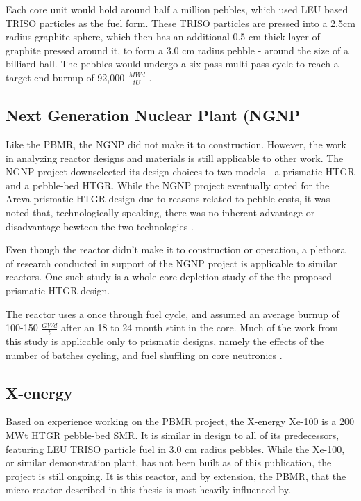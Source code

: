 

Each core unit would hold around half a million pebbles, which used LEU based TRISO particles as the fuel form.  These TRISO particles are pressed into a 2.5cm radius graphite sphere, which then has an additional 0.5 cm thick layer of graphite pressed around it, to form a 3.0 cm radius pebble - around the size of a billiard ball.  The pebbles would undergo a six-pass multi-pass cycle to reach a target end burnup of 92,000 $\frac{MWd}{tU}$ \cite{venter_pbmr_2005}. 

\subsection{Next Generation Nuclear Plant (NGNP}

Like the PBMR, the NGNP did not make it to construction.  However, the work in analyzing reactor designs and materials is still applicable to other work.  The NGNP project downselected its design choices to two models - a prismatic HTGR and a pebble-bed HTGR.  While the NGNP project eventually opted for the Areva prismatic HTGR design \cite{noauthor_areva_nodate} due to reasons related to pebble costs, it was noted that, technologically speaking, there was no inherent advantage or disadvantage bewteen the two technologies \cite{inl_basis_2011}.

Even though the reactor didn't make it to construction or operation, a plethora of research conducted in support of the NGNP project is applicable to similar reactors.  One such study is a whole-core depletion study of the the proposed prismatic HTGR design.

The reactor uses a once through fuel cycle, and assumed an average burnup of 100-150 $\frac{GWd}{t}$ after an 18 to 24 month stint in the core.  Much of the work from this study is applicable only to prismatic designs, namely the effects of the number of batches cycling, and fuel shuffling on core neutronics \cite{tkkim_whole-core_nodate}.

\subsection{X-energy}

Based on experience working on the PBMR project, the X-energy Xe-100 is a 200 MWt HTGR pebble-bed SMR.  It is similar in design to all of its predecessors, featuring LEU TRISO particle fuel in 3.0 cm radius pebbles.  While the Xe-100, or similar demonstration plant, has not been built as of this publication, the project is still ongoing.  It is this reactor, and by extension, the PBMR, that the micro-reactor described in this thesis is most heavily influenced by.

